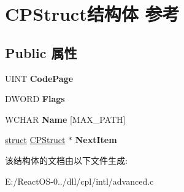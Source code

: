 \hypertarget{struct_c_p_struct}{}\section{C\+P\+Struct结构体 参考}
\label{struct_c_p_struct}
\subsection*{Public 属性}
\begin{DoxyCompactItemize}
\item 
\mbox{\label{struct_c_p_struct_a31303e109033b4ab3a84f106da7de5ac}} 
U\+I\+NT {\bfseries Code\+Page}
\item 
\mbox{\label{struct_c_p_struct_acf2f664f78cc4a4392b2e11bbfe5ae9f}} 
D\+W\+O\+RD {\bfseries Flags}
\item 
\mbox{\label{struct_c_p_struct_ac0b61938489bd7c9188c9b3c079b15f8}} 
W\+C\+H\+AR {\bfseries Name} \mbox{[}M\+A\+X\+\_\+\+P\+A\+TH\mbox{]}
\item 
\mbox{\label{struct_c_p_struct_af3ee87ff8e42dfbff53e7684e52f773a}} 
\hyperlink{interfacestruct}{struct} \hyperlink{struct_c_p_struct}{C\+P\+Struct} $\ast$ {\bfseries Next\+Item}
\end{DoxyCompactItemize}


该结构体的文档由以下文件生成\+:\begin{DoxyCompactItemize}
\item 
E\+:/\+React\+O\+S-\/0../dll/cpl/intl/advanced.\+c\end{DoxyCompactItemize}
